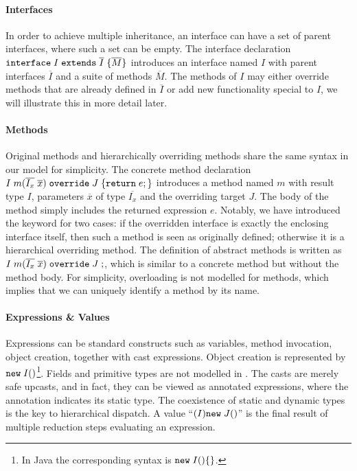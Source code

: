 \paragraph{Interfaces}
In order to achieve multiple inheritance, an interface can have a set of 
parent interfaces, where such a set can be empty. The interface declaration $\texttt{interface} \; I \; \texttt{extends} \; \overline{I} \; {\{} \overline{M} {\}}$ introduces an interface named $I$ with parent interfaces $\overline{I}$ and a suite of methods $\overline{M}$. The methods of $I$ may either override methods that are already defined in $\overline{I}$ or add new functionality special to $I$, we will illustrate this in more detail later.

\paragraph{Methods}
Original methods and hierarchically overriding methods share the same syntax in our model for simplicity.
The concrete method declaration $I \; m (\overline{I_x} \; \overline{x}) \; \texttt{override} \; J \; {\{} \texttt{return} \; e ; {\}}$ introduces a
method named $m$ with result type $I$, parameters $\overline{x}$ of
type $\overline{I_x}$ and the overriding target $J$. The body of the
method simply includes the returned expression $e$. Notably, we have introduced the
\kwoverride{} keyword for two cases: if the overridden interface is exactly the enclosing
interface itself, then such a method is seen as originally defined; otherwise it is a hierarchical overriding method. The definition
of abstract methods is written as $I \; m (\overline{I_x} \; \overline{x}) \; \texttt{override} \; J \; ;$, which is
similar to a concrete method but without the method body. 
For simplicity, overloading is not modelled for methods, which
implies that we can uniquely identify a method by its name.

\paragraph{Expressions \& Values}
Expressions can be standard constructs such as variables, method
invocation, object creation, together with cast expressions. 
Object creation is represented by $\texttt{new} \; I()$\footnote{In Java the corresponding syntax is $\texttt{new} \; I()\{\}$.}. Fields and primitive types are not modelled in \MIM{}. 
The casts are merely safe upcasts, and in fact, they can be viewed as
annotated expressions, where the annotation indicates its static type.
The coexistence of static and dynamic types is the key to hierarchical dispatch.
A value
``$(I)\texttt{new} \; J()$''
is the final result of multiple reduction steps evaluating an
expression.

